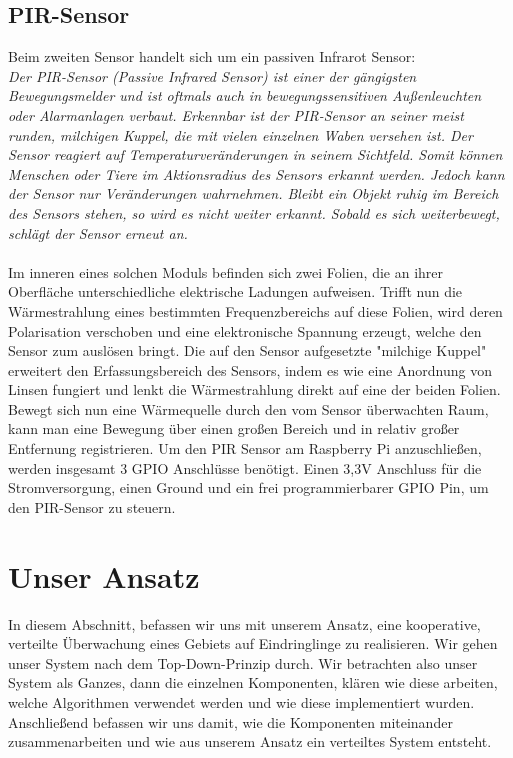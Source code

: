 \documentclass[journal]{IEEEtran}
\begin{document}
\subsection{PIR-Sensor}
Beim zweiten Sensor handelt sich um ein passiven Infrarot Sensor:\\ \textit{Der PIR-Sensor (Passive Infrared Sensor) ist einer der gängigsten Bewegungsmelder und ist oftmals auch in bewegungssensitiven Außenleuchten oder Alarmanlagen verbaut. Erkennbar ist der PIR-Sensor an seiner meist runden, milchigen Kuppel, die mit vielen einzelnen Waben versehen ist. Der Sensor reagiert auf Temperaturveränderungen in seinem Sichtfeld. Somit können Menschen oder Tiere im Aktionsradius des Sensors erkannt werden. Jedoch kann der Sensor nur Veränderungen wahrnehmen. Bleibt ein Objekt ruhig im Bereich des Sensors stehen, so wird es nicht weiter erkannt.  Sobald es sich weiterbewegt, schlägt der Sensor erneut an.}\cite[S. 493]{Raspi}\\ \\ Im inneren eines solchen Moduls befinden sich zwei Folien, die an ihrer Oberfläche unterschiedliche elektrische Ladungen aufweisen. Trifft nun die Wärmestrahlung eines bestimmten Frequenzbereichs auf diese Folien, wird deren Polarisation verschoben und eine elektronische Spannung erzeugt, welche den Sensor zum auslösen bringt. Die auf den Sensor aufgesetzte "milchige Kuppel" erweitert den Erfassungsbereich des Sensors, indem es wie eine Anordnung von Linsen fungiert und lenkt die Wärmestrahlung direkt auf eine der beiden Folien. Bewegt sich nun eine Wärmequelle durch den vom Sensor überwachten Raum, kann man eine Bewegung über einen großen Bereich und in relativ großer Entfernung registrieren.\cite{pir} Um den PIR Sensor am Raspberry Pi anzuschließen, werden insgesamt 3 GPIO Anschlüsse benötigt. Einen 3,3V Anschluss für die Stromversorgung, einen Ground und ein frei programmierbarer GPIO Pin, um den PIR-Sensor zu steuern.


\section{Unser Ansatz} 

In diesem Abschnitt, befassen wir uns mit unserem Ansatz, eine kooperative, verteilte Überwachung eines Gebiets auf Eindringlinge zu realisieren. Wir gehen unser System nach dem Top-Down-Prinzip durch. Wir betrachten also unser System als Ganzes, dann die einzelnen Komponenten, klären wie diese arbeiten, welche Algorithmen verwendet werden und wie diese implementiert wurden. Anschließend befassen wir uns damit, wie die Komponenten miteinander zusammenarbeiten und wie aus unserem Ansatz ein verteiltes System entsteht.
\end{document}
